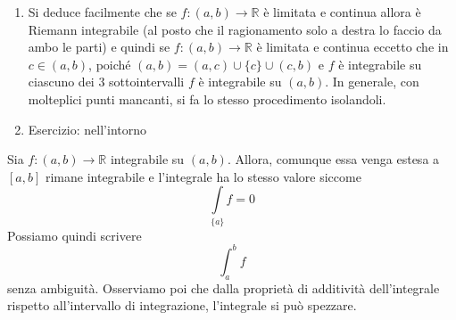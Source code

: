 \documentclass[a4paper]{article}
\begin{document}
{\begin{enumerate}
\begin{enumerate}
            in \([a,b]\) e
            \begin{align*}
                0 \leq \int\limits_{[a,b)} \psi_\varepsilon - \int\limits_{[a,b)} \varphi_\varepsilon
                &= \left(\,
                    \int\limits_{[a,b-\delta]} \psi_\varepsilon' -
                    \int\limits_{[a,b-\delta]} \varphi_\varepsilon'
                \right) \\
                 &+ \left(\,
                    \int\limits_{[b-\delta, b)} M - \int\limits_{[b-\delta, b)} (-M)
                 \right) \\
                 &= \left(\,
                    \int\limits_{[a,b-\delta]} \psi_\varepsilon' -
                    \int\limits_{[a,b-\delta]} \varphi_\varepsilon'
                \right) + 2M\delta \\
                &< \frac{\varepsilon}{2} + \frac{\varepsilon}{2} = \varepsilon
            \end{align*}
        \end{enumerate}
        \item Si deduce facilmente che se \(f\colon (a,b) \to \mathbb{R}\) è limitata e continua allora è Riemann integrabile
        (al posto che il ragionamento solo a destra lo faccio da ambo le parti)
        e quindi se \(f\colon (a,b) \to \mathbb{R}\) è limitata e continua eccetto che in \(c\in (a,b)\),
        poiché \((a,b) = (a,c) \cup \{c\} \cup (c,b)\) e \(f\) è integrabile su ciascuno dei \(3\)
        sottointervalli \(f\) è integrabile su \((a,b)\).
        In generale, con molteplici punti mancanti, si fa lo stesso procedimento isolandoli.
        \item Esercizio: nell'intorno 
    \end{enumerate}
}


Sia \(f\colon (a,b) \to \mathbb{R}\) integrabile su \((a,b)\).
Allora, comunque essa venga estesa a \([a,b]\) rimane integrabile e l'integrale ha lo stesso valore
siccome
\[
    \int\limits_{\{a\}} f = 0
\]
Possiamo quindi scrivere
\[
    \int_a^b f
\]
senza ambiguità.
Osserviamo poi che dalla proprietà di additività dell'integrale rispetto all'intervallo di integrazione,
l'integrale si può spezzare.

\end{document}
